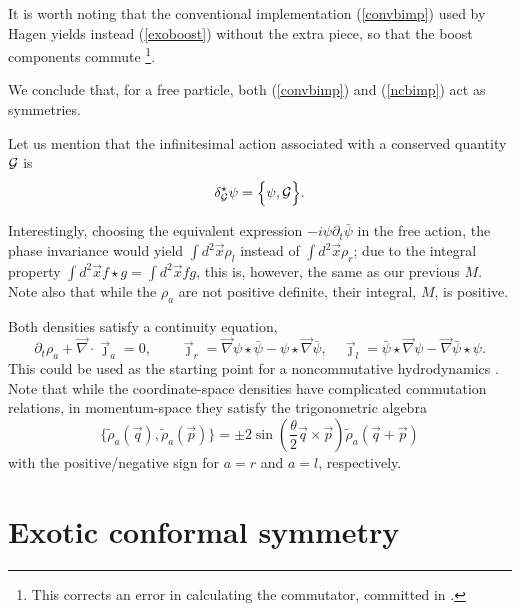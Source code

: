 \documentclass[a4paper,11pt]{article}
\let\ssection=\section
\renewcommand{\section}{\setcounter{equation}{0}\ssection}
\def\p{{\partial}}
\def\vx{{\vec x}}
\def\vp{{\vec p}}
\def\vq{{\vec q}}
\def\vj{{\vec{\jmath}}}
\def\vnabla{{\vec\nabla}}
\begin{document}
It is worth noting that
the conventional implementation (\ref{convbimp})
used by Hagen \cite{Hagen}
yields instead (\ref{exoboost}) without the extra piece,
so that the boost components  commute
\footnote{This corrects an error in calculating
the commutator, committed in \cite{DH}.}.

We conclude that, for a free particle, both (\ref{convbimp}) and
(\ref{ncbimp}) act as symmetries.

Let us mention that
the infinitesimal action associated with a
conserved quantity ${\cal G}$ is
\begin{equation}
     \delta^\star_{{\cal G}}\psi=\Big\{\psi,{\cal G}\Big\}.
     \label{record}
\end{equation}


Interestingly, choosing the equivalent expression
$-i\psi\p_{t}\bar{\psi}$
in the free action, the phase invariance would yield
$\int\!d^2\vx\rho_{l}$ instead of
$\int\!d^2\vx \rho_{r}$; due to the integral property
$\int \!d^2\vx f\star g=\int\!d^2\vx fg$, this is, however,
the same as our previous $M$.
Note also that while the $\rho_{a}$ are
not positive definite, their integral, $M$, is positive.

Both densities satisfy a continuity equation,
\begin{equation}
\p_{t}\rho_{a}+\vnabla\cdot\vj_{a}=0,
\qquad
\vj_{r}=\vnabla\psi\star\bar{\psi}-
\psi\star\vnabla\bar{\psi},
\quad
\vj_{l}=
\bar{\psi}\star\vnabla\psi
-\vnabla\bar{\psi}\star\psi.
\label{current}
\end{equation}
This could be used as the starting point for a
noncommutative hydrodynamics \cite{NChydro}.
Note that while the coordinate-space densities
have complicated commutation relations, in
momentum-space they satisfy the trigonometric
algebra \cite{trigonal}
\begin{equation}
     \Big\{\widetilde{\rho}_{a}(\vq),\widetilde{\rho}_{a}(\vp)\Big\}
     =
    \pm 2\sin\left(\frac{\theta}{2}\vq\times\vp\right)
     \widetilde{\rho}_{a}(\vq+\vp)
     \label{trigonalg}
\end{equation}
with the positive/negative sign for $a=r$ and $a=l$, respectively.
\goodbreak

\section{Exotic conformal symmetry}
\end{document}
